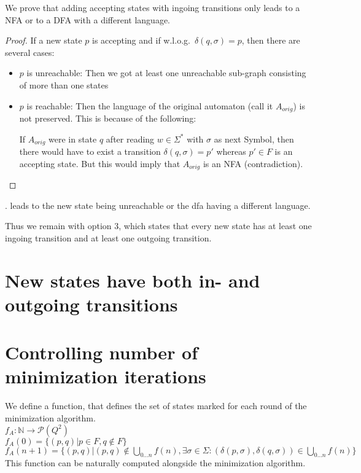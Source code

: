 \documentclass[a4paper, oneside, 11pt]{report}
\theoremstyle{definition}
\theoremstyle{remark}
\begin{document}
We prove that adding accepting states with ingoing transitions only leads to a NFA or to a DFA with a different language.
\begin{proof}
	If a new state $p$ is accepting and if w.l.o.g.\ $\delta(q, \sigma) = p$, then there are several cases:
	\begin{itemize}
		\item $p$ is unreachable: Then we got at least one unreachable sub-graph consisting of more than one states
		\item $p$ is reachable: Then the language of the original automaton (call it $A_{orig}$) is not preserved. This is because of the following:
		
		If $A_{orig}$ were in state $q$ after reading $w \in \Sigma^*$ with $\sigma$ as next Symbol, then there would have to exist a transition $\delta(q, \sigma) = p'$ whereas $p' \in F$ is an accepting state. But this would imply that $A_{orig}$ is an NFA (contradiction).
	\end{itemize}
\end{proof}

. leads to the new state being unreachable or the dfa having a different language.

Thus we remain with option 3, which states that every new state has at least one ingoing transition and at least one outgoing transition.

\section{New states have both in- and outgoing transitions}

\section{Controlling number of minimization iterations}

We define a function, that defines the set of states marked for each round of the minimization algorithm. \\
$f_A \colon \mathbb{N} \to \mathcal{P}(Q^2)$ \\
$f_A(0) = \{ (p,q) | p \in F, q \notin F \}$ \\
$f_A(n+1) = \{ (p,q) | (p,q) \notin \bigcup\limits_{0 \dots n}f(n), \exists \sigma \in \Sigma \colon (\delta(p,\sigma), \delta(q,\sigma)) \in \bigcup\limits_{0 \dots n}f(n)\}$ \\
This function can be naturally computed alongside the minimization algorithm.
\end{document}
